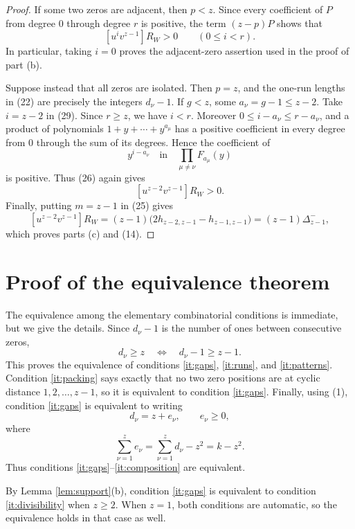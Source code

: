 \documentclass[11pt]{article}
\begin{document}
\begin{proof}
If some two zeros are adjacent, then $p<z$.  Since every coefficient of
$P$ from degree $0$ through degree $r$ is positive, the term $(z-p)P$
shows that
\[
                    [u^iv^{z-1}]R_W>0
                    \qquad(0\leq i<r).                       \tag{30}
\]
In particular, taking $i=0$ proves the adjacent-zero assertion used in
the proof of part (b).

Suppose instead that all zeros are isolated.  Then $p=z$, and the
one-run lengths in (22) are precisely the integers $d_\nu-1$.  If
$g<z$, some $a_\nu=g-1\leq z-2$.  Take $i=z-2$ in (29).  Since
$r\geq z$, we have $i<r$.  Moreover
$0\leq i-a_\nu\leq r-a_\nu$, and a product of polynomials
$1+y+\cdots+y^{a_\mu}$ has a positive coefficient in every degree
from $0$ through the sum of its degrees.  Hence the coefficient of
\[
 y^{i-a_\nu}
 \quad\text{in}\quad
 \prod_{\mu\ne\nu}F_{a_\mu}(y)
\]
is positive.  Thus (26) again gives
\[
                    [u^{z-2}v^{z-1}]R_W>0.
\]
Finally, putting $m=z-1$ in (25) gives
\[
 [u^{z-2}v^{z-1}]R_W
    =(z-1)\bigl(2h_{z-2,z-1}-h_{z-1,z-1}\bigr)
    =(z-1)\Delta_{z-1}^-,                                   \tag{31}
\]
which proves parts (c) and (14).
\end{proof}

\section{Proof of the equivalence theorem}

The equivalence among the elementary combinatorial conditions is
immediate, but we give the details.  Since $d_\nu-1$ is the number of
ones between consecutive zeros,
\[
 d_\nu\geq z
 \quad\Longleftrightarrow\quad
 d_\nu-1\geq z-1.                                          \tag{32}
\]
This proves the equivalence of conditions
\ref{it:gaps}, \ref{it:runs}, and \ref{it:patterns}.
Condition \ref{it:packing} says exactly that no two zero positions are
at cyclic distance $1,2,\ldots,z-1$, so it is equivalent to
condition \ref{it:gaps}.  Finally, using (1), condition
\ref{it:gaps} is equivalent to writing
\[
 d_\nu=z+e_\nu,\qquad e_\nu\geq0,
\]
where
\[
 \sum_{\nu=1}^{z}e_\nu
     =\sum_{\nu=1}^{z}d_\nu-z^2=k-z^2.
\]
Thus conditions \ref{it:gaps}--\ref{it:composition} are equivalent.

By Lemma \ref{lem:support}(b), condition \ref{it:gaps} is equivalent
to condition \ref{it:divisibility} when $z\geq2$.  When $z=1$, both
conditions are automatic, so the equivalence holds in that case as
well.
\end{document}
